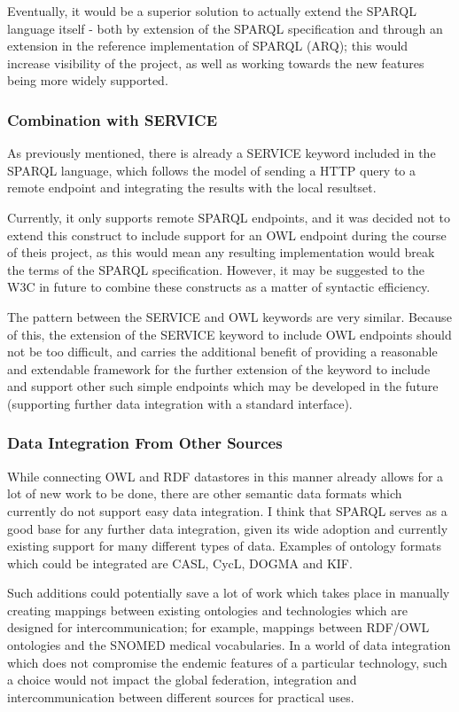 \documentclass{article}
\begin{document}
Eventually, it would be a superior solution to actually extend the SPARQL
language itself - both by extension of the SPARQL
specification and through an extension in the reference implementation of SPARQL
(ARQ); this would increase visibility of the
project, as well as working towards the new features being more widely
supported.

\subsubsection{Combination with SERVICE}

As previously mentioned, there is already a SERVICE keyword included in the
SPARQL language, which follows the model of sending a HTTP query to a remote
endpoint and integrating the results with the local resultset. 

Currently, it only supports remote SPARQL endpoints, and it was decided not to 
extend this construct to include support for an OWL endpoint during the course
of theis project, as this would mean any resulting implementation would break 
the terms of the SPARQL specification. However, it may be suggested to the W3C 
in future to combine these constructs as a matter of syntactic efficiency. 

The pattern between the SERVICE and OWL keywords are very
similar. Because of this, the extension of the SERVICE keyword to include OWL
endpoints should not be too difficult, and carries the additional benefit of
providing a reasonable and extendable framework for the further extension of the
keyword to include and support other such simple endpoints which may be
developed in the future (supporting further data integration with a standard
interface).

\subsubsection{Data Integration From Other Sources}

While connecting OWL and RDF datastores in this manner already allows for a lot
of new work to be done, there are other semantic data formats which currently do 
not support easy data integration. I think that SPARQL serves as a good base for 
any further data integration, given its wide adoption and currently existing 
support for many different types of data. Examples of ontology formats which
could be integrated are CASL, CycL, DOGMA and KIF.

Such additions could potentially save a lot of work which takes place in
manually creating mappings between existing ontologies and technologies which
are designed for intercommunication; for example, mappings between RDF/OWL ontologies and the
SNOMED medical vocabularies. In a world of data integration which does not
compromise the endemic features of a particular technology, such a choice would
not impact the global federation, integration and intercommunication between
different sources for practical uses.
\end{document}
